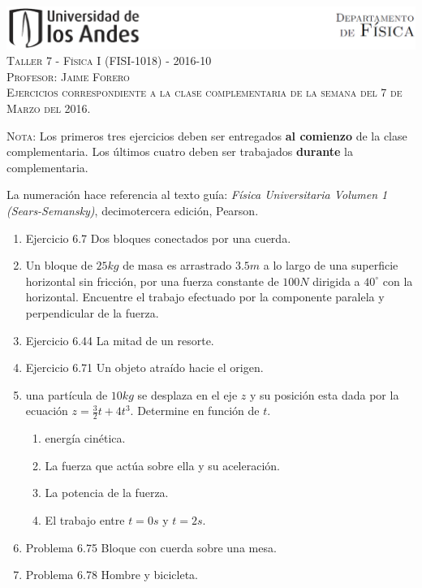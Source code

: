 \documentclass[letterpaper,10pt,onecolumn]{article}
\begin{document}
\begin{center}


\includegraphics[width=490pt]{header.png}\\[0.5cm]

\textsc{\LARGE Taller 7 - F\'isica I (FISI-1018) - 2016-10}\\[0.5cm]

\textsc{\Large{Profesor: Jaime Forero}} \\[0.5cm]

\noindent\textsc{Ejercicios correspondiente a la clase complementaria de la semana del 7 de Marzo del 2016.}\\[0.5cm]
\end{center}

\noindent\textsc{Nota:} 
Los primeros tres ejercicios deben ser
entregados {\bf al comienzo} de la clase complementaria. Los \'ultimos
cuatro deben ser trabajados {\bf durante} la complementaria. 

La numeraci\'on
hace referencia al texto gu\'ia: \textit{F\'isica Universitaria Volumen
  1 (Sears-Semansky)}, decimotercera edici\'on, Pearson.

\begin{enumerate}

\item Ejercicio 6.7 Dos bloques conectados por una cuerda. %
\item Un bloque de $25kg$ de masa es  arrastrado $3.5m$ a lo largo de una superficie horizontal sin fricción, por una  fuerza constante de $100N$  dirigida a $40^{\circ}$ con la horizontal. Encuentre el  trabajo efectuado por la componente paralela y perpendicular de la fuerza.
\item Ejercicio 6.44 La mitad de un resorte.

\item Ejercicio 6.71 Un objeto atraído hacie el origen. %

\item una partícula de $10kg$  se desplaza en el eje $z$ y su posición esta dada por la ecuación $z=\frac{3}{2}t+4t^3$. Determine en función de $t$.
\begin{enumerate}
\item energía cinética. 
\item La fuerza que actúa sobre ella y su aceleración. 
\item La potencia de la fuerza. 
\item El trabajo entre $t=0s$ y $t=2s$.
\end{enumerate}
\item Problema 6.75 Bloque con cuerda sobre una mesa.
\item Problema 6.78 Hombre y bicicleta.
 \end{enumerate}
 
\end{document}
